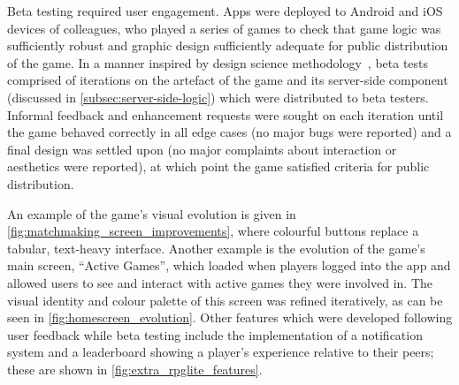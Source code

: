 Beta testing required user engagement. Apps were deployed to Android and iOS
devices of colleagues, who played a series of games to check that game logic was
sufficiently robust and graphic design sufficiently adequate for public
distribution of the game. In a manner inspired by design science
methodology~\cite{johannesson2014introduction}, beta tests comprised of
iterations on the artefact of the game and its server-side component (discussed
in \cref{subsec:server-side-logic}) which were distributed to beta testers.
Informal feedback and enhancement requests were sought on each iteration until
the game behaved correctly in all edge cases (no major bugs were reported) and a
final design was settled upon (no major complaints about interaction or
aesthetics were reported), at which point the game satisfied criteria for public
distribution.

An example of the game's visual evolution is given in
\cref{fig:matchmaking_screen_improvements}, where colourful buttons replace a
tabular, text-heavy interface. Another example is the evolution of the game's
main screen, ``Active Games'', which loaded when players logged into the app and
allowed users to see and interact with active games they were involved in. The
visual identity and colour palette of this screen was refined iteratively, as
can be seen in \cref{fig:homescreen_evolution}. Other features which were
developed following user feedback while beta testing include the implementation
of a notification system and a leaderboard showing a player's experience
relative to their peers; these are shown in
\cref{fig:extra_rpglite_features}. 


